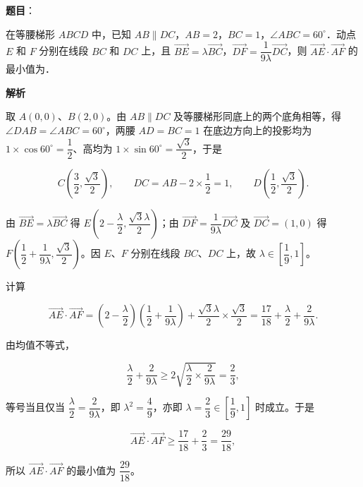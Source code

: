 \begin{answer}

\textbf{题目}：

在等腰梯形 \(ABCD\) 中，已知 \(AB\parallel DC\)，\(AB=2\)，\(BC=1\)，\(\angle ABC=60^{\circ}\)．动点 \(E\) 和 \(F\) 分别在线段 \(BC\) 和 \(DC\) 上，且 \(\overrightarrow{BE}=\lambda\overrightarrow{BC}\)，\(\overrightarrow{DF}=\dfrac{1}{9\lambda}\overrightarrow{DC}\)，则 \(\overrightarrow{AE}\cdot\overrightarrow{AF}\) 的最小值为\gkblank{}．

\textbf{解析}

取 \(A(0,0)\)、\(B(2,0)\)。由 \(AB\parallel DC\) 及等腰梯形同底上的两个底角相等，得 \(\angle DAB=\angle ABC=60^{\circ}\)，两腰 \(AD=BC=1\) 在底边方向上的投影均为 \(1\times\cos60^{\circ}=\dfrac12\)、高均为 \(1\times\sin60^{\circ}=\dfrac{\sqrt3}2\)，于是

\nopagebreak[4]
\[
C\left(\dfrac32,\dfrac{\sqrt3}2\right),\qquad DC=AB-2\times\dfrac12=1,\qquad D\left(\dfrac12,\dfrac{\sqrt3}2\right).
\]

由 \(\overrightarrow{BE}=\lambda\overrightarrow{BC}\) 得 \(E\left(2-\dfrac{\lambda}2,\dfrac{\sqrt3\lambda}2\right)\)；由 \(\overrightarrow{DF}=\dfrac1{9\lambda}\overrightarrow{DC}\) 及 \(\overrightarrow{DC}=(1,0)\) 得 \(F\left(\dfrac12+\dfrac1{9\lambda},\dfrac{\sqrt3}2\right)\)。因 \(E\)、\(F\) 分别在线段 \(BC\)、\(DC\) 上，故 \(\lambda\in\left[\dfrac19,1\right]\)。

计算

\nopagebreak[4]
\[
\overrightarrow{AE}\cdot\overrightarrow{AF}=\left(2-\dfrac{\lambda}2\right)\left(\dfrac12+\dfrac1{9\lambda}\right)+\dfrac{\sqrt3\lambda}2\times\dfrac{\sqrt3}2=\dfrac{17}{18}+\dfrac{\lambda}2+\dfrac2{9\lambda}.
\]

由均值不等式，

\nopagebreak[4]
\[
\dfrac{\lambda}2+\dfrac2{9\lambda}\geqslant2\sqrt{\dfrac{\lambda}2\times\dfrac2{9\lambda}}=\dfrac23,
\]

等号当且仅当 \(\dfrac{\lambda}2=\dfrac2{9\lambda}\)，即 \(\lambda^2=\dfrac49\)，亦即 \(\lambda=\dfrac23\in\left[\dfrac19,1\right]\) 时成立。于是

\nopagebreak[4]
\[
\overrightarrow{AE}\cdot\overrightarrow{AF}\geqslant\dfrac{17}{18}+\dfrac23=\dfrac{29}{18},
\]

所以 \(\overrightarrow{AE}\cdot\overrightarrow{AF}\) 的最小值为 \(\dfrac{29}{18}\)。


\end{answer}
